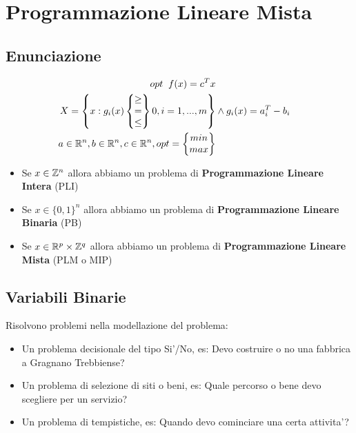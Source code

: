 \chapter{Programmazione Lineare Mista}

\section{Enunciazione}

\begin{align*}
    opt \;\; f(x) = c^Tx \\
    X = \begin{Bmatrix} x : g_i(x) \begin{Bmatrix} \geq \\ = \\ \leq \end{Bmatrix} 0, i = 1,...,m \end{Bmatrix} &\land g_i(x) = a_i^T - b_i \\
    a \in \mathbb{R}^n, b \in \mathbb{R}^n, c \in \mathbb{R}^n, opt = \begin{Bmatrix} min \\ max \end{Bmatrix}
\end{align*}

\begin{itemize}
    \item Se $x \in \mathbb{Z}^n$ allora abbiamo un problema di \textbf{Programmazione Lineare Intera} (PLI)
    \item Se $x \in \{0,1\}^n$ allora abbiamo un problema di \textbf{Programmazione Lineare Binaria} (PB)
    \item Se $x \in \mathbb{R}^p \times \mathbb{Z}^q$ allora abbiamo un problema di \textbf{Programmazione Lineare Mista} (PLM o MIP)
\end{itemize}

\section{Variabili Binarie}

Risolvono problemi nella modellazione del problema:
\begin{itemize}
    \item Un problema decisionale del tipo Si'/No, es: Devo costruire o no una fabbrica a Gragnano Trebbiense?
    \item Un problema di selezione di siti o beni, es: Quale percorso o bene devo scegliere per un servizio?
    \item Un problema di tempistiche, es: Quando devo cominciare una certa attivita'? \\
\end{itemize}

